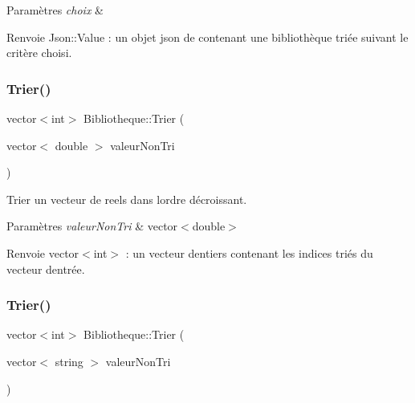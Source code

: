 \begin{DoxyParams}{Paramètres}
{\em choix} & \\
\hline
\end{DoxyParams}
\begin{DoxyReturn}{Renvoie}
Json\+::\+Value \+: un objet json de contenant une bibliothèque triée suivant le critère choisi. 
\end{DoxyReturn}
\mbox{\label{classBibliotheque_ad62c3fc7fd3829a0634a22ad98aa9332}} 
\subsubsection{\texorpdfstring{Trier()}{Trier()}\hspace{0.1cm}{\footnotesize\ttfamily [2/4]}}
{\footnotesize\ttfamily vector$<$int$>$ Bibliotheque\+::\+Trier (\begin{DoxyParamCaption}\item[{vector$<$ double $>$}]{valeur\+Non\+Tri }\end{DoxyParamCaption})}



Trier un vecteur de reels dans l\textquotesingle{}ordre décroissant. 


\begin{DoxyParams}{Paramètres}
{\em valeur\+Non\+Tri} & vector$<$double$>$ \\
\hline
\end{DoxyParams}
\begin{DoxyReturn}{Renvoie}
vector$<$int$>$ \+: un vecteur d\textquotesingle{}entiers contenant les indices triés du vecteur d\textquotesingle{}entrée. 
\end{DoxyReturn}
\mbox{\label{classBibliotheque_af95534b5f7fba8f1a6dcd1215bd55f96}} 
\subsubsection{\texorpdfstring{Trier()}{Trier()}\hspace{0.1cm}{\footnotesize\ttfamily [3/4]}}
{\footnotesize\ttfamily vector$<$int$>$ Bibliotheque\+::\+Trier (\begin{DoxyParamCaption}\item[{vector$<$ string $>$}]{valeur\+Non\+Tri }\end{DoxyParamCaption})}



